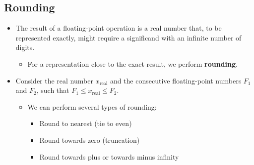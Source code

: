 \documentclass[12pt,openany]{book}
\begin{document}
			      	\subsection{Rounding}
			      	\begin{itemize}
			      		\item[] The result of a floating-point operation is a real number that, to be represented exactly, might require a significand with an infinite number of digits.
			      		      \begin{itemize}
			      		      	\item[] For a representation close to the exact result, we perform \textbf{rounding}.
			      		      \end{itemize}
			      		\item[] Consider the real number \( x_{\text{real}} \) and the consecutive floating-point numbers \( F_1 \) and \( F_2 \), such that \( F_1 \leq x_{\text{real}} \leq F_2 \).
			      		      \begin{itemize}
			      		      	\item[] We can perform several types of rounding:
			      		      	      \begin{itemize}
			      		      	      	\item[] Round to nearest (tie to even)
			      		      	      	\item[] Round towards zero (truncation)
			      		      	      	\item[] Round towards plus or towards minus infinity
			      		      	      \end{itemize}
			      		      \end{itemize}
			      	\end{itemize}
\end{document}
